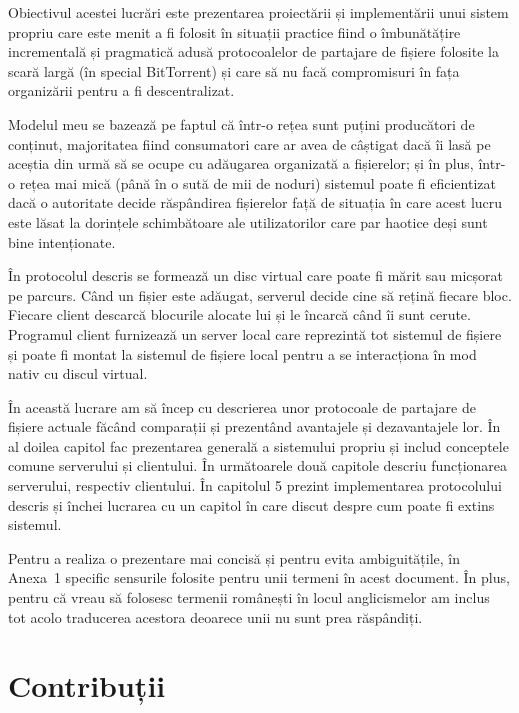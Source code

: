 \documentclass[a4wide,12pt]{report}
\newcommand{\acr}[1]{{\textsmaller[1]{\textsc{#1}}}} %
\begin{document}
Obiectivul acestei lucrări este prezentarea proiectării și implementării unui sistem propriu care este menit a fi
folosit în situații practice fiind o îmbunătățire incrementală și pragmatică adusă protocoalelor de partajare de fișiere
folosite la scară largă (în special BitTorrent) și care să nu facă compromisuri în fața organizării pentru a fi
descentralizat.

Modelul meu se bazează pe faptul că într-o rețea sunt puțini producători de conținut, majoritatea fiind consumatori care
ar avea de câștigat dacă îi lasă pe aceștia din urmă să se ocupe cu adăugarea organizată a fișierelor; și în plus,
într-o rețea mai mică (până în o sută de mii de noduri) sistemul poate fi eficientizat dacă o autoritate decide
răspândirea fișierelor față de situația în care acest lucru este lăsat la dorințele schimbătoare ale utilizatorilor
care par haotice deși sunt bine intenționate.

În protocolul descris se formează un disc virtual care poate fi mărit sau micșorat pe parcurs. Când un fișier este
adăugat, serverul decide cine să rețină fiecare bloc. Fiecare client descarcă blocurile alocate lui și le încarcă când
îi sunt cerute. Programul client furnizează un server \acr{FTP} local care reprezintă tot sistemul de fișiere și poate
fi montat la sistemul de fișiere local pentru a se interacționa în mod nativ cu discul virtual.

În această lucrare am să încep cu descrierea unor protocoale de partajare de fișiere actuale făcând comparații și
prezentând avantajele și dezavantajele lor. În al doilea capitol fac prezentarea generală a sistemului propriu și includ
conceptele comune serverului și clientului. În următoarele două capitole descriu funcționarea serverului, respectiv
clientului. În capitolul 5 prezint implementarea protocolului descris și închei lucrarea cu un capitol în care discut
despre cum poate fi extins sistemul.

Pentru a realiza o prezentare mai concisă și pentru evita ambiguitățile, în Anexa~1 specific sensurile folosite pentru
unii termeni în acest document. În plus, pentru că vreau să folosesc termenii românești în locul anglicismelor am inclus
tot acolo traducerea acestora deoarece unii nu sunt prea răspândiți.

\chapter*{Contribuții}
\end{document}
